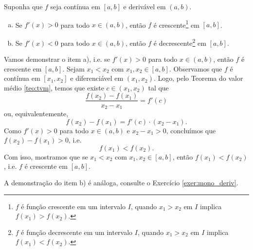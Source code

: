 \begin{corol}\label{corol:mono_deriv}
  Suponha que $f$ seja contínua em $[a,b]$ e derivável em $(a,b)$.
  \begin{enumerate}[a)]
  \item Se $f'(x)>0$ para todo $x\in (a,b)$, então $f$ é crescente\footnote{$f$ é função crescente em um intervalo $I$, quando $x_1>x_2$ em $I$ implica $f(x_1)>f(x_2)$.} em $[a,b]$.
  \item Se $f'(x)<0$ para todo $x\in (a,b)$, então $f$ é decrescente\footnote{$f$ é função decrescente em um intervalo $I$, quando $x_1>x_2$ em $I$ implica $f(x_1)<f(x_2)$.} em $[a,b]$.
  \end{enumerate}
\end{corol}
\begin{dem}
  Vamos demonstrar o item a), i.e. se $f'(x)>0$ para todo $x\in (a, b)$, então $f$ é crescente em $[a, b]$. Sejam $x_1<x_2$ com $x_1,x_2\in [a, b]$. Observamos que $f$ é contínua em $[x_1, x_2]$ e diferenciável em $(x_1, x_2)$. Logo, pelo Teorema do valor médio \ref{teo:tvm}, temos que existe $c\in (x_1, x_2)$ tal que
  \begin{equation}
    \frac{f(x_2)-f(x_1)}{x_2-x_1} = f'(c)
  \end{equation}
  ou, equivalentemente,
  \begin{equation}
    f(x_2)-f(x_1) = f'(c)\cdot(x_2-x_1).
  \end{equation}
  Como $f'(x)>0$ para todo $x\in (a, b)$ e $x_2-x_1>0$, concluímos que $f(x_2)-f(x_1)>0$, i.e.
  \begin{equation}
    f(x_1) < f(x_2).
  \end{equation}
  Com isso, mostramos que se $x_1<x_2$ com $x_1,x_2\in [a, b]$, então $f(x_1)<f(x_2)$, i.e. $f$ é crescente em $[a, b]$.

  A demonstração do item b) é análoga, consulte o Exercício \ref{exer:mono_deriv}.
\end{dem}

